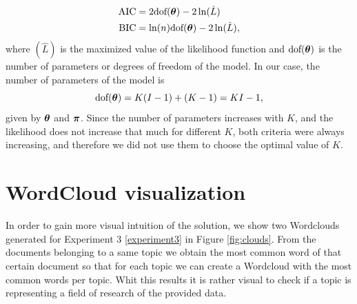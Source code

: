 \documentclass[12pt]{article}
\begin{document}
\begin{align}
\mathrm { AIC } & = 2 \text{dof}(\boldsymbol\theta) - 2 \ln ( \hat { L } )\\
\mathrm { BIC } & = \ln ( n )\text{dof}(\boldsymbol\theta)- 2 \ln ( \hat { L } ), 
\end{align}
where $ ( \hat { L } )$ is the maximized value of the likelihood function and $\text{dof}(\boldsymbol\theta)$ is the number of parameters or degrees of freedom of the model. In our case, the number of parameters of the model is 
\begin{equation}
\text{dof}(\boldsymbol\theta) = K(I-1) + (K-1) = KI-1,
\end{equation}
given by $\boldsymbol\theta$ and $\boldsymbol\pi$. Since the number of parameters increases with $K$, and the likelihood does not increase that much for different $K$, both criteria were always increasing, and therefore we did not use them to choose the optimal value of $K$.

\section{WordCloud visualization}

In order to gain more visual intuition of the solution, we show two Wordclouds generated for Experiment 3 \ref{experiment3} in Figure \ref{fig:clouds}. From the documents belonging to a same topic we obtain the most common word of that certain document so that for each topic we can create a Wordcloud with the most common words per topic. Whit this results it is rather visual to check if a topic is representing a field of research of the provided data.
\end{document}
